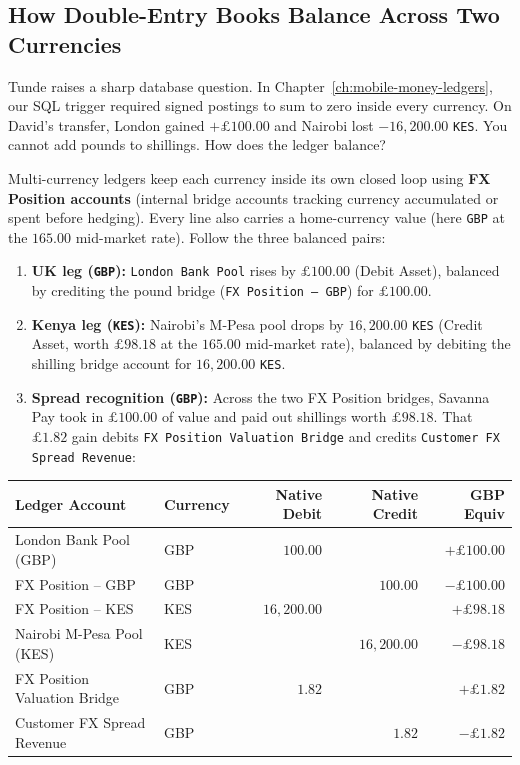 \subsection{How Double-Entry Books Balance Across Two Currencies}

Tunde raises a sharp database question. In Chapter~\ref{ch:mobile-money-ledgers}, our SQL trigger required signed postings to sum to zero inside every currency. On David's transfer, London gained $+\pounds 100.00$ and Nairobi lost $-16{,}200.00$ \texttt{KES}. You cannot add pounds to shillings. How does the ledger balance?

Multi-currency ledgers keep each currency inside its own closed loop using \textbf{FX Position accounts} (internal bridge accounts tracking currency accumulated or spent before hedging). Every line also carries a home-currency value (here \texttt{GBP} at the $165.00$ mid-market rate). Follow the three balanced pairs:
\begin{enumerate}
  \item \textbf{UK leg (\texttt{GBP}):} \texttt{London Bank Pool} rises by $\pounds 100.00$ (Debit Asset), balanced by crediting the pound bridge (\texttt{FX Position -- GBP}) for $\pounds 100.00$.
  \item \textbf{Kenya leg (\texttt{KES}):} Nairobi's M-Pesa pool drops by $16{,}200.00$ \texttt{KES} (Credit Asset, worth $\pounds 98.18$ at the $165.00$ mid-market rate), balanced by debiting the shilling bridge account for $16{,}200.00$ \texttt{KES}.
  \item \textbf{Spread recognition (\texttt{GBP}):} Across the two FX Position bridges, Savanna Pay took in $\pounds 100.00$ of value and paid out shillings worth $\pounds 98.18$. That $\pounds 1.82$ gain debits \texttt{FX Position Valuation Bridge} and credits \texttt{Customer FX Spread Revenue}:
\end{enumerate}

\begin{center}
\small
\begin{tabular}{llrrr}
\toprule
\textbf{Ledger Account} & \textbf{Currency} & \textbf{Native Debit} & \textbf{Native Credit} & \textbf{GBP Equiv} \\
\midrule
London Bank Pool (GBP) & GBP & $100.00$ & & $+\pounds 100.00$ \\
FX Position -- GBP & GBP & & $100.00$ & $-\pounds 100.00$ \\
\midrule
FX Position -- KES & KES & $16{,}200.00$ & & $+\pounds 98.18$ \\
Nairobi M-Pesa Pool (KES) & KES & & $16{,}200.00$ & $-\pounds 98.18$ \\
\midrule
FX Position Valuation Bridge & GBP & $1.82$ & & $+\pounds 1.82$ \\
Customer FX Spread Revenue & GBP & & $1.82$ & $-\pounds 1.82$ \\
\bottomrule
\end{tabular}
\end{center}

